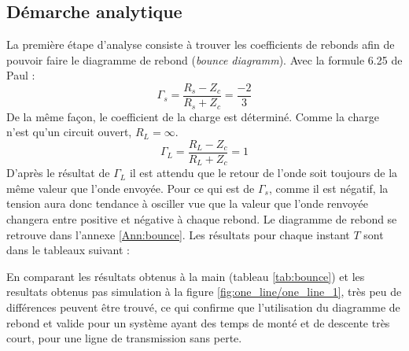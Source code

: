 \subsection{Démarche analytique}
La première étape d'analyse consiste à trouver les coefficients de rebonds afin de pouvoir faire le diagramme de rebond (\textit{bounce diagramm}).
Avec la formule 6.25 de Paul :
\begin{equation}
\Gamma_s = \frac{R_s - Z_c}{R_s + Z_c} = \frac{-2}{3}
\end{equation}
De la même façon, le coefficient de la charge est déterminé.
Comme la charge n'est qu'un circuit ouvert, $R_L = \infty$.
\begin{equation}
\Gamma_L = \frac{R_L - Z_c}{R_L + Z_c} = 1
\end{equation}
D'après le résultat de $\Gamma_L$ il est attendu que le retour de l'onde soit toujours de la même valeur que l'onde envoyée. Pour ce qui est de $\Gamma_s$, comme il est négatif, la tension aura donc tendance à osciller vue que la valeur que l'onde renvoyée changera entre positive et négative à chaque rebond.
Le diagramme de rebond se retrouve dans l'annexe \ref{Ann:bounce}. 
Les résultats pour chaque instant $T$ sont dans le tableaux suivant :



En comparant les résultats obtenus à la main (tableau \ref{tab:bounce}) et les resultats obtenus pas simulation à la figure \ref{fig:one_line/one_line_1}, très peu de différences peuvent être trouvé, ce qui confirme que l'utilisation du diagramme de rebond et valide pour un système ayant des temps de monté et de descente très court, pour une ligne de transmission sans perte.


\vspace{0.3cm}
\vspace{0.3cm}

